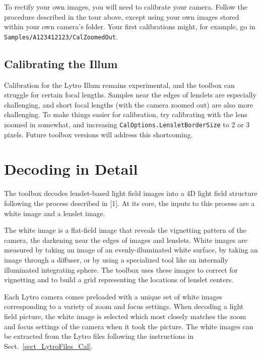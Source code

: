 \documentclass[onecolumn]{article}
\newcommand{\SymbolText}[1]{\texttt{\small #1}}
\begin{document}
To rectify your own images, you will need to calibrate your camera.  Follow the procedure described in the tour above, except using your own images stored within your own camera's folder.  Your first calibrations might, for example, go in \SymbolText{Samples/A123412123/CalZoomedOut}.


\subsection{Calibrating the Illum}

Calibration for the Lytro Illum remains experimental, and the toolbox can struggle for certain focal lengths.  Samples near the edges of lenslets are especially challenging, and short focal lengths (with the camera zoomed out) are also more challenging. To make things easier for calibration, try calibrating with the lens zoomed in somewhat, and increasing \SymbolText{CalOptions.LensletBorderSize} to 2 or 3 pixels. Future toolbox versions will address this shortcoming.


\section{Decoding in Detail}
\label{sect_DecodingInDetail}

The toolbox decodes lenslet-based light field images into a 4D light field structure following the process described in [1]. At its core, the inputs to this process are a white image and a lenslet image. 

The white image is a flat-field image that reveals the vignetting pattern of the camera, the darkening near the edges of images and lenslets.  White images are measured by taking an image of an evenly-illuminated white surface, by taking an image through a diffuser, or by using a specialized tool like an internally illuminated integrating sphere. The toolbox uses these images to correct for vignetting and to build a grid representing the locations of lenslet centers.

Each Lytro camera comes preloaded with a unique set of white images corresponding to a variety of zoom and focus settings. When decoding a light field picture, the white image is selected which most closely matches the zoom and focus settings of the camera when it took the picture. The white images can be extracted from the Lytro files following the instructions in Sect.~\ref{sect_LytroFiles_Cal}.
\end{document}
